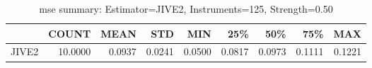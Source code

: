 \begin{table}[ht]
\centering
\caption{mse summary: Estimator=JIVE2, Instruments=125, Strength=0.50}
\begin{tabular}{lrrrrrrrr}
\toprule
 & COUNT & MEAN & STD & MIN & 25\% & 50\% & 75\% & MAX \\
\midrule
JIVE2 & 10.0000 & 0.0937 & 0.0241 & 0.0500 & 0.0817 & 0.0973 & 0.1111 & 0.1221 \\
\bottomrule
\end{tabular}
\end{table}
